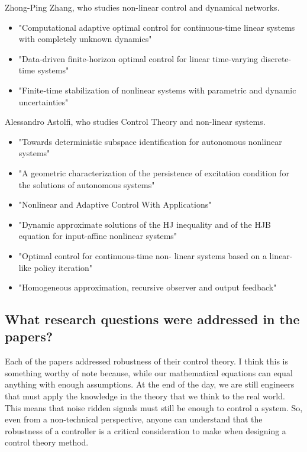 \documentclass{IEEEtran}
\begin{document}
Zhong-Ping Zhang, who studies non-linear control and dynamical networks.

\begin{itemize}
    \item "Computational adaptive optimal control for continuous-time linear systems with completely unknown dynamics" \cite{JIANG20122699}
    \item "Data-driven finite-horizon optimal control for linear time-varying discrete-time systems" \cite{8619347}
    \item "Finite-time stabilization of nonlinear systems with parametric and dynamic uncertainties" \cite{4026648}
\end{itemize}

Alessandro Astolfi, who studies Control Theory and non-linear systems.

\begin{itemize}
    \item "Towards deterministic subspace identification for autonomous nonlinear systems" \cite{7402097}
    \item "A geometric characterization of the persistence of excitation condition for the solutions of autonomous systems"\cite{7902166}
    \item "Nonlinear and Adaptive Control With Applications"
    \item "Dynamic approximate solutions of the HJ inequality and of the HJB equation for input-affine nonlinear systems" \cite{book}
    \item "Optimal control for continuous-time non- linear systems based on a linear-like policy iteration"\cite{9029697}
    \item "Homogeneous approximation, recursive observer and output feedback"\cite{Andrieu_2008}
\end{itemize}


\subsection{What research questions were addressed in the papers?}
Each of the papers addressed robustness of their control theory. I think this is something worthy of note because, while our mathematical equations can equal anything with enough assumptions. At the end of the day, we are still engineers that must apply the knowledge in the theory that we think to the real world. This means that noise ridden signals must still be enough to control a system. So, even from a non-technical perspective, anyone can understand that the robustness of a controller is a critical consideration to make when designing a control theory method.
\end{document}
